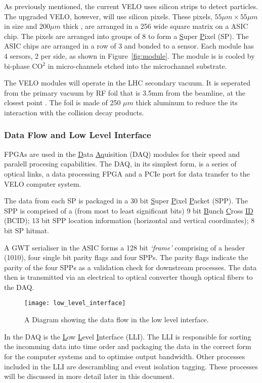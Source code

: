       As previously mentioned, the current VELO uses silicon strips to detect particles.
      The upgraded VELO, however, will use silicon pixels.
      These pixels, $55 \mu m \times 55 \mu m$ in size and $200 \mu m$ thick \cite{velo_design_report}, are arranged in a 256 wide square matrix on a ASIC chip.
      The pixels are arranged into groups of 8 to form a \underline{S}uper \underline{P}ixel (SP).
      The ASIC chips are arranged in a row of 3 and bonded to a sensor.
      Each module has 4 sersors, 2 per side, as shown in Figure~\ref{fig:module}. 
      The module is is cooled by bi-phase CO$^2$ in micro-channels etched into the microchannel substrate. \cite{velo_design_report}
      \par
      The VELO modules will operate in the LHC secondary vacuum.
      It is seperated from the primary vacuum by RF foil that is 3.5mm from the beamline, at the closest point \cite{velo_design_report}.
      The foil is made of 250 $\mu m$ thick aluminum to reduce the its interaction with the collision decay products. 

      \subsubsection{Data Flow and Low Level Interface}   

      FPGAs are used in the \underline{D}ata \underline{Aq}uisition (DAQ) modules for their speed and paralell procesing capabilities.
      The DAQ, in its simplest form, is a series of optical links, a data processing FPGA and a PCIe port for data transfer to the VELO computer system.
      \par
      The data from each SP is packaged in a 30 bit \underline{S}uper \underline{P}ixel \underline{P}acket (SPP). The SPP is comprised of  a (from most to least significant bits) 9 bit \underline{B}unch \underline{C}ross \underline{ID} (BCID); 13 bit SPP location information (horizontal and vertical coordinates); 8 bit SP hitmat.
      \par
      A GWT serialiser in the ASIC forms a 128 bit \textit{`frame'} comprising of a header (1010), four single bit parity flags and four SPPs.
      The parity flags indicate the parity of the four SPPs as a validation check for downstream processes.
      The data then is transmitted via an electrical to optical converter though optical fibers to the DAQ.
      \begin{figure}[ht]
        \centering
        \texttt{[image: low\_level\_interface]}
        \caption{A Diagram showing the data flow in the low level interface.}
        \label{fig:lli}
      \end{figure}
      In the DAQ is the \underline{L}ow \underline{L}evel \underline{I}nterface (LLI).
      The LLI is responsible for sorting the incomming data into time order and packaging the data in the correct form for the computer systems and to optimise output bandwidth.
      Other processes included in the LLI are descrambling and event isolation tagging.
      These processes will be discussed in more detail later in this document.
